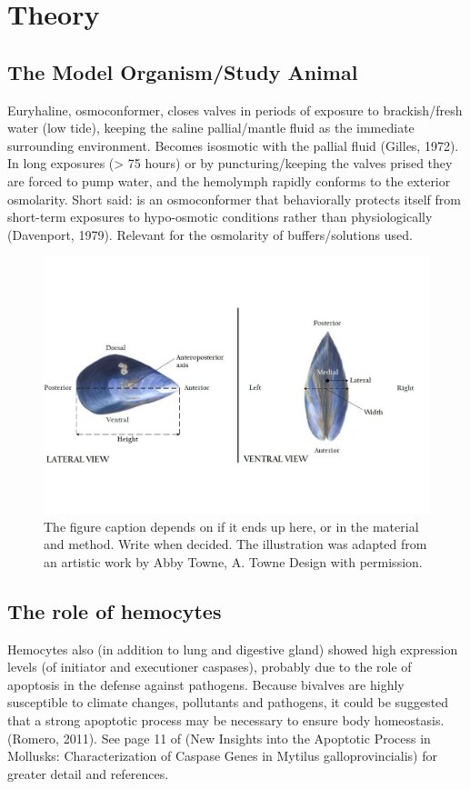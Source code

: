 \chapter{Theory}
\section{The Model Organism/Study Animal}
Euryhaline, osmoconformer, closes valves in periods of exposure to brackish/fresh water (low tide), keeping the saline pallial/mantle fluid as the immediate surrounding environment. Becomes isosmotic with the pallial fluid (Gilles, 1972). In long exposures (> 75 hours) or by puncturing/keeping the valves prised they are forced to pump water, and the hemolymph rapidly conforms to the exterior osmolarity. Short said: is an osmoconformer that behaviorally protects itself from short-term exposures to hypo-osmotic conditions rather than physiologically (Davenport, 1979). Relevant for the osmolarity of buffers/solutions used.

\begin{figure}[H]
    \centering
    \includegraphics[width=\textwidth]{figures/Anatomy/M_edulis_anatomical_axis_lateral.jpg}
    \caption{The figure caption depends on if it ends up here, or in the material and method. Write when decided. The illustration was adapted from an artistic work by Abby Towne, A. Towne Design with permission.}
    \label{fig:anatomical_axis}
\end{figure}

\section{The role of hemocytes}
Hemocytes also (in addition to lung and digestive gland) showed high expression levels (of initiator and executioner caspases), probably due to the role of apoptosis in the defense against pathogens. Because bivalves are highly susceptible to climate changes, pollutants and pathogens, it  could be suggested that a strong apoptotic process may be necessary to ensure body homeostasis. (Romero, 2011). See page 11 of (New Insights into the Apoptotic Process in Mollusks: Characterization of Caspase Genes in Mytilus galloprovincialis) for greater detail and references.


